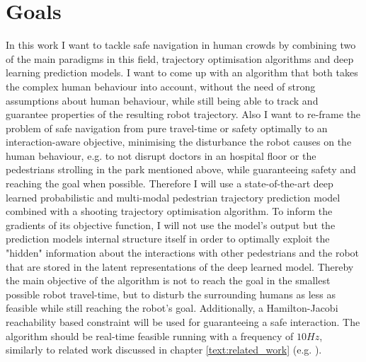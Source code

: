 \section{Goals}
\label{text:introduction/goals}
In this work I want to tackle safe navigation in human crowds by combining two of the main paradigms in this field, trajectory optimisation algorithms and deep learning prediction models. I want to come up with an algorithm that both takes the complex human behaviour into account, without the need of strong assumptions about human behaviour, while still being able to track and guarantee properties of the resulting robot trajectory. Also I want to re-frame the problem of safe navigation from pure travel-time or safety optimally to an interaction-aware objective, minimising the disturbance the robot causes on the human behaviour, e.g. to not disrupt doctors in an hospital floor or the pedestrians strolling in the park mentioned above, while guaranteeing safety and reaching the goal when possible.
\newline
Therefore I will use a state-of-the-art deep learned probabilistic and multi-modal pedestrian trajectory prediction model combined with a shooting trajectory optimisation algorithm. To inform the gradients of its objective function, I will not use the model's output but the prediction models internal structure itself in order to optimally exploit the "hidden" information about the interactions with other pedestrians and the robot that are stored in the latent representations of the deep learned model. Thereby the main objective of the algorithm is not to reach the goal in the smallest possible robot travel-time, but to disturb the surrounding humans as less as feasible while still reaching the robot's goal. Additionally, a Hamilton-Jacobi reachability based constraint will be used for guaranteeing a safe interaction. The algorithm should be real-time feasible running with a frequency of $10 Hz$, similarly to related work discussed in chapter \ref{text:related_work} (e.g. \cite{Chen2017}).



